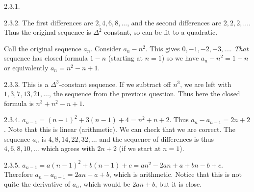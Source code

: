  \protect {} \protect \begin {itemize} 
\begin{ans}{2.3.1.}
	
\end{ans}
\begin{ans}{2.3.2.}
		The first differences are $2, 4, 6, 8, \ldots$, and the second differences are $2, 2, 2, \ldots$.  Thus the original sequence is $\Delta^2$-constant, so can be fit to a quadratic.

		Call the original sequence $a_n$.  Consider $a_n - n^2$. This gives $0, -1, -2, -3, \ldots$.  \emph{That} sequence has closed formula $1-n$ (starting at $n = 1$) so we have $a_n - n^2 = 1-n$ or equivalently $a_n = n^2 - n + 1$.
	
\end{ans}
\begin{ans}{2.3.3.}
	 This is a $\Delta^3$-constant sequence.  If we subtract off $n^3$, we are left with $1, 3, 7, 13, 21, \ldots$, the sequence from the previous question.  Thus here the closed formula is $n^3 + n^2 - n + 1$.
	
\end{ans}
\begin{ans}{2.3.4.}
		$a_{n-1} = (n-1)^2 + 3(n-1) + 4 = n^2 + n + 2$.  Thus $a_n - a_{n-1} = 2n+2$.  Note that this is linear (arithmetic).  We can check that we are correct.  The sequence $a_n$ is $4, 8, 14, 22, 32, \ldots$ and the sequence of differences is thus $4, 6, 8, 10,\ldots$ which agrees with $2n+2$ (if we start at $n = 1$).
	
\end{ans}
\begin{ans}{2.3.5.}
		$a_{n-1} = a(n-1)^2 + b(n-1) + c = an^2 - 2an + a + bn - b + c$.  Therefore $a_n - a_{n-1} = 2an - a + b$, which is arithmetic.  Notice that this is not quite the derivative of $a_n$, which would be $2an + b$, but it is close.
	

\end{ans}
\end{itemize}
